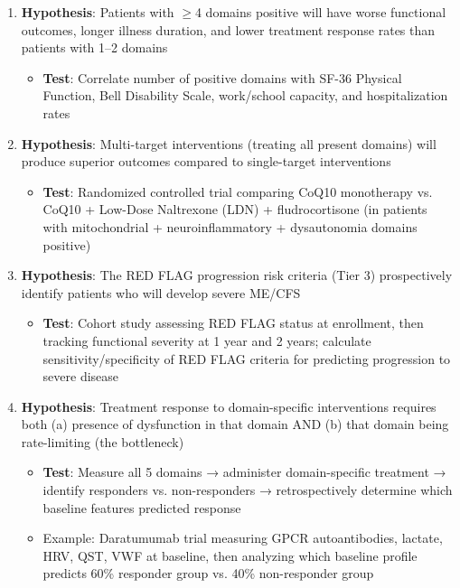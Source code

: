 \begin{enumerate}
    \item \textbf{Hypothesis}: Patients with $\geq$4 domains positive will have worse functional outcomes, longer illness duration, and lower treatment response rates than patients with 1--2 domains
    \begin{itemize}
        \item \textbf{Test}: Correlate number of positive domains with SF-36 Physical Function, Bell Disability Scale, work/school capacity, and hospitalization rates
    \end{itemize}

    \item \textbf{Hypothesis}: Multi-target interventions (treating all present domains) will produce superior outcomes compared to single-target interventions
    \begin{itemize}
        \item \textbf{Test}: Randomized controlled trial comparing CoQ10 monotherapy vs. CoQ10 + Low-Dose Naltrexone (LDN) + fludrocortisone (in patients with mitochondrial + neuroinflammatory + dysautonomia domains positive)
    \end{itemize}

    \item \textbf{Hypothesis}: The RED FLAG progression risk criteria (Tier 3) prospectively identify patients who will develop severe ME/CFS
    \begin{itemize}
        \item \textbf{Test}: Cohort study assessing RED FLAG status at enrollment, then tracking functional severity at 1 year and 2 years; calculate sensitivity/specificity of RED FLAG criteria for predicting progression to severe disease
    \end{itemize}

    \item \textbf{Hypothesis}: Treatment response to domain-specific interventions requires both (a) presence of dysfunction in that domain AND (b) that domain being rate-limiting (the bottleneck)
    \begin{itemize}
        \item \textbf{Test}: Measure all 5 domains → administer domain-specific treatment → identify responders vs. non-responders → retrospectively determine which baseline features predicted response
        \item Example: Daratumumab trial measuring GPCR autoantibodies, lactate, HRV, QST, VWF at baseline, then analyzing which baseline profile predicts 60\% responder group vs. 40\% non-responder group
    \end{itemize}


\end{enumerate}

